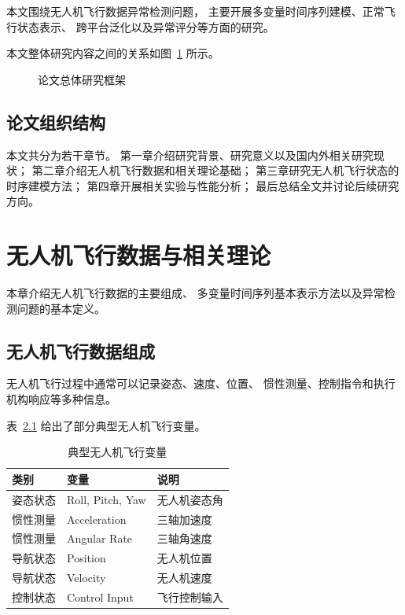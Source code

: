 \documentclass[
  degree=master,
  degree-type=academic
]{gzuthesis}
\begin{document}
本文围绕无人机飞行数据异常检测问题，
主要开展多变量时间序列建模、正常飞行状态表示、
跨平台泛化以及异常评分等方面的研究。

本文整体研究内容之间的关系如图~\ref{fig:framework} 所示。

\begin{figure}[htbp]
    \centering
    \caption{论文总体研究框架}
    \label{fig:framework}
\end{figure}


\section{论文组织结构}

本文共分为若干章节。
第一章介绍研究背景、研究意义以及国内外相关研究现状；
第二章介绍无人机飞行数据和相关理论基础；
第三章研究无人机飞行状态的时序建模方法；
第四章开展相关实验与性能分析；
最后总结全文并讨论后续研究方向。



\chapter{无人机飞行数据与相关理论}

本章介绍无人机飞行数据的主要组成、
多变量时间序列基本表示方法以及异常检测问题的基本定义。


\section{无人机飞行数据组成}

无人机飞行过程中通常可以记录姿态、速度、位置、
惯性测量、控制指令和执行机构响应等多种信息。

表~\ref{tab:variables} 给出了部分典型无人机飞行变量。

\begin{table}[htbp]
    \centering
    \caption{典型无人机飞行变量}
    \label{tab:variables}
    \begin{tabular}{lll}
        \toprule
        类别 & 变量 & 说明 \\
        \midrule
        姿态状态 & Roll, Pitch, Yaw & 无人机姿态角 \\
        惯性测量 & Acceleration & 三轴加速度 \\
        惯性测量 & Angular Rate & 三轴角速度 \\
        导航状态 & Position & 无人机位置 \\
        导航状态 & Velocity & 无人机速度 \\
        控制状态 & Control Input & 飞行控制输入 \\
        \bottomrule
    \end{tabular}
\end{table}
\end{document}
